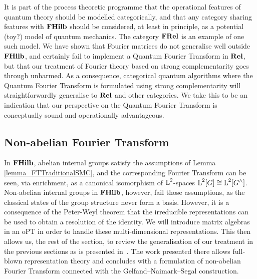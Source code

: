 It is part of the process theoretic programme that the operational features of quantum theory should be modelled categorically, and that any category sharing features with $\mathbf{FHilb}$ should be considered, at least in principle, as a potential (toy?) model of quantum mechanics. The category $\mathbf{FRel}$ is an example of one such model. We have shown that Fourier matrices do not generalise well outside $\mathbf{FHilb}$, and certainly fail to implement a Quantum Fourier Transform in $\mathbf{Rel}$, but that our treatment of Fourier theory based on strong complementarity goes through unharmed. As a consequence, categorical quantum algorithms where the Quantum Fourier Transform is formulated using strong complementarity will straightforwardly generalise to $\mathbf{Rel}$ and other categories. We take this to be an indication that our perspective on the Quantum Fourier Transform is conceptually sound and operationally advantageous.

\subsection{Non-abelian Fourier Transform}
\label{section_NonAbelianFourierTransform}

In $\mathbf{FHilb}$, abelian internal groups satisfy the assumptions of Lemma \ref{lemma_FTTraditionalSMC}, and the corresponding Fourier Transform can be seen, via enrichment, as a canonical isomorphism of $\operatorname{L}^2$-spaces $\operatorname{L}^2[G] \cong \operatorname{L}^2[G^\wedge]$. Non-abelian internal groups in $\mathbf{FHilb}$, however, fail those assumptions, as the classical states of the group structure never form a basis. However, it is a consequence of the Peter-Weyl theorem that the irreducible representations can be used to obtain a resolution of the identity. We will introduce matrix algebras in an oPT in order to handle these multi-dimensional representations. This then allows us, the rest of the section, to review the generalisation of our treatment in the previous sections as is presented in~\cite{gogioso2015fourier}. The work presented there allows full-blown representation theory and concludes with a formulation of non-abelian Fourier Transform connected with the Gelfand--Naimark--Segal construction.

